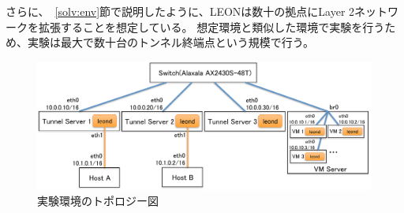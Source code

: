 さらに、~\ref{solv:env}節で説明したように、LEONは数十の拠点にLayer 2ネットワークを拡張することを想定している。
想定環境と類似した環境で実験を行うため、実験は最大で数十台のトンネル終端点という規模で行う。

\begin{figure}
	\begin{center}
		\includegraphics[scale=0.65]{./img/experimenttopology}
		\caption{実験環境のトポロジー図}
		\label{img:experimenttopology}
	\end{center}
\end{figure}

